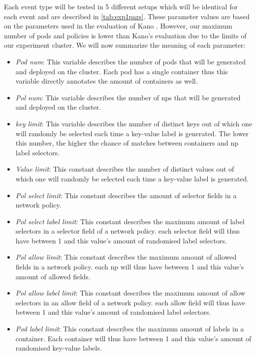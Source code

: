 Each event type will be tested in 5 different setups which will be identical for each event and are described in \autoref{tab:exp1pars}. These parameter values are based on the parameters used in the evaluation of Kano \cite{kano}. However, our maximum number of pods and policies is lower than Kano's evaluation due to the limits of our experiment cluster. We will now summarize the meaning of each parameter:
\begin{itemize}
    \item \textit{Pod num}: This variable describes the number of pods that will be generated and deployed on the cluster. Each pod has a single container thus this variable directly annotates the amount of containers as well.
    \item \textit{Pol num}: This variable describes the number of \acrshort{np}s that will be generated and deployed on the cluster.
    \item \textit{key limit}: This variable describes the number of distinct keys out of which one will randomly be selected each time a key-value label is generated. The lower this number, the higher the chance of matches between containers and \acrshort{np} label selectors.
    \item \textit{Value limit}: This constant describes the number of distinct values out of which one will randomly be selected each time a key-value label is generated.
    \item \textit{Pol select limit}: This constant describes the amount of selector fields in a network policy.
    \item \textit{Pol select label limit}: This constant describes the maximum amount of label selectors in a selector field of a network policy. each selector field will thus have between 1 and this value's amount of randomised label selectors.
    \item \textit{Pol allow limit}: This constant describes the maximum amount of allowed fields in a network policy. each \acrshort{np} will thus have between 1 and this value's amount of allowed fields.
    \item \textit{Pol allow label limit}: This constant describes the maximum amount of allow selectors in an allow field of a network policy. each allow field will thus have between 1 and this value's amount of randomised label selectors.
     \item \textit{Pod label limit}: This constant describes the maximum amount of labels in a container. Each container will thus have between 1 and this value's amount of randomised key-value labels.
\end{itemize}

